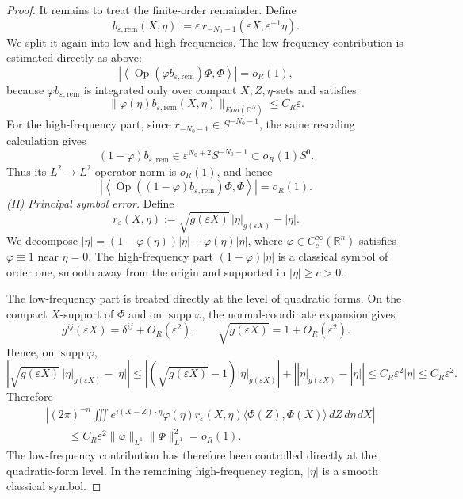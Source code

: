 \documentclass[10pt,a4paper]{amsart}
\begin{document}
\begin{proof}
	It remains to treat the finite-order remainder. Define
	\[
	b_{\varepsilon,\mathrm{rem}}(X,\eta)
	:=
	\varepsilon\,r_{-N_0-1}(\varepsilon X,\varepsilon^{-1}\eta).
	\]
	We split it again into low and high frequencies. The low-frequency contribution
	is estimated directly as above:
	\[
	\left|
	\left\langle
	\operatorname{Op}(\varphi b_{\varepsilon,\mathrm{rem}})\Phi,\Phi
	\right\rangle
	\right|
	=o_R(1),
	\]
	because \(\varphi b_{\varepsilon,\mathrm{rem}}\) is integrated only over compact
	\(X,Z,\eta\)-sets and satisfies
	\[
	\|\varphi(\eta)b_{\varepsilon,\mathrm{rem}}(X,\eta)\|_{End(\mathbb{C}^N)}
	\le C_R\varepsilon .
	\]
	For the high-frequency part, since \(r_{-N_0-1}\in S^{-N_0-1}\), the same
	rescaling calculation gives
	\[
	(1-\varphi)b_{\varepsilon,\mathrm{rem}}
	\in
	\varepsilon^{N_0+2}S^{-N_0-1}
	\subset	o_R(1)S^0.
	\]
	Thus its \(L^2\to L^2\) operator norm is \(o_R(1)\), and hence
	\[
	\left|
	\left\langle
	\operatorname{Op}((1-\varphi)b_{\varepsilon,\mathrm{rem}})\Phi,\Phi
	\right\rangle
	\right|
	=o_R(1).
	\]
	\smallskip
	\noindent\emph{(II) Principal symbol error.}
	Define
	\[
	r_\varepsilon(X,\eta) := \sqrt{g(\varepsilon X)}\,|\eta|_{g(\varepsilon X)} - |\eta|.
	\]
	We decompose $|\eta| = (1-\varphi(\eta))|\eta| + \varphi(\eta)|\eta|$, where
	$\varphi \in C_c^\infty(\mathbb{R}^n)$ satisfies $\varphi \equiv 1$ near
	$\eta = 0$. The high-frequency part $(1-\varphi)|\eta|$ is a classical symbol
	of order one, smooth away from the origin and supported in $|\eta| \ge c > 0$.
	
	The low-frequency part is treated directly at the level of quadratic forms.
	On the compact \(X\)-support of \(\Phi\) and on \(\operatorname{supp}\varphi\),
	the normal-coordinate expansion gives
	\[
	g^{ij}(\varepsilon X)=\delta^{ij}+O_R(\varepsilon^2),
	\qquad
	\sqrt{g(\varepsilon X)}=1+O_R(\varepsilon^2).
	\]
	Hence, on $\operatorname{supp}\varphi$,
	\[
	\left|	\sqrt{g(\varepsilon X)}\,|\eta|_{g(\varepsilon X)}-|\eta|
	\right|\leq \left| {(\sqrt {g(\varepsilon X)}  - 1)|\eta {|_{g(\varepsilon X)}}} \right| + \left| {|\eta {|_{g(\varepsilon X)}} - |\eta |} \right|	\le C_R\varepsilon^2|\eta|
	\le C_R\varepsilon^2.
	\]
	Therefore
	\[
	\begin{aligned}
		&\left|	(2\pi)^{-n}	\iiint
		e^{i(X-Z)\cdot\eta}
		\varphi(\eta)	r_\varepsilon(X,\eta)
		\langle \Phi(Z),\Phi(X)\rangle
		\,dZ\,d\eta\,dX	\right| \\
		&\qquad\le	C_R\varepsilon^2
		\|\varphi\|_{L^1}\|\Phi\|_{L^1}^2
		=o_R(1).
	\end{aligned}
	\] 
	The low-frequency contribution has therefore been controlled directly at the
	quadratic-form level. In the remaining high-frequency region, \(|\eta|\) is a
	smooth classical symbol. 
	

\end{proof}
\end{document}
